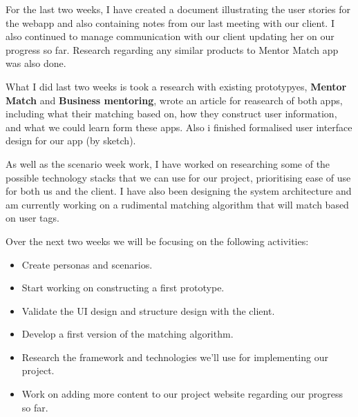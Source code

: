 \documentclass[11pt]{report}
\begin{document}
\bigskip
{}
\smallskip

\noindent
For the last two weeks, I have created a document illustrating the user stories for the webapp and also containing notes from our last meeting with our client. I also continued to manage communication with our client updating her on our progress so far. Research regarding any similar products to Mentor Match app was also done.\\

\bigskip
{}
\smallskip

\noindent
What I did last two weeks is took a research with existing prototypyes, \textbf{Mentor Match} and \textbf{Business mentoring}, wrote an article for reasearch of both apps, including what their matching based on, how they construct user information, and what we could learn form these apps. Also i finished formalised user interface design for our app (by sketch).\\

\bigskip
{}
\smallskip

\noindent
As well as the scenario week work, I have worked on researching some of the possible technology stacks that we can use for our project, prioritising ease of use for both us and the client. I have also been designing the system architecture and am currently working on a rudimental matching algorithm that will match based on user tags.\\

\bigskip
{}
\smallskip

\noindent
Over the next two weeks we will be focusing on the following activities:

\begin{itemize}
  \item Create personas and scenarios.
  \item Start working on constructing a first prototype.
  \item Validate the UI design and structure design with the client.
  \item Develop a first version of the matching algorithm.
  \item Research the framework and technologies we'll use for implementing our project.
  \item Work on adding more content to our project website regarding our progress so far.
\end{itemize}
\end{document}
